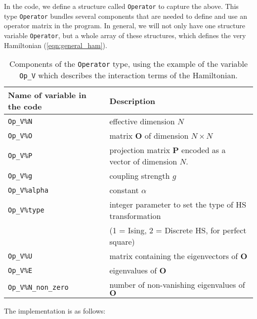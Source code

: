 In the code, we define a structure called \texttt{Operator} to capture the above. 
This type \texttt{Operator} bundles several components that are needed to define and use an operator matrix in the program.  
In general, we will not only have one structure variable \texttt{Operator}, but a whole  array of these structures, which defines the very Hamiltonian (\ref{eqn:general_ham}). 
%
\begin{table}[h]
   \begin{tabular}{l l}
    Name of variable in the code & Description \\\hline
    \texttt{Op\_V\%N}            &  effective dimension $N$ \\
    \texttt{Op\_V\%O}            &  matrix  $\mathbf{O}$  of dimension $N \times N$\\
    \texttt{Op\_V\%P}            &  projection matrix $\mathbf{P}$  encoded as a vector of dimension $N$.\\
     \texttt{Op\_V\%g}            &  coupling strength $g$ \\  
    \texttt{Op\_V\%alpha}      &  constant $\alpha$ \\
    \texttt{Op\_V\%type}        &  integer parameter to set the type of 
                                             HS transformation\\
                                &  (1 = Ising, 2 = Discrete HS, for perfect square)  \\ 
    \texttt{Op\_V\%U}            &  matrix containing the eigenvectors of $\mathbf{O}$  \\
    \texttt{Op\_V\%E}            &  eigenvalues of $\mathbf{O}$ \\
    \texttt{Op\_V\%N\_non\_zero} &  number of non-vanishing eigenvalues of $\mathbf{O}$ 
   \end{tabular}
   \caption{Components of the \texttt{Operator}  type, using the example of the variable \texttt{Op\_V} 
   which describes the interaction terms of the Hamiltonian.
    \label{Operator.type}}
\end{table}
%
The implementation is as follows:
